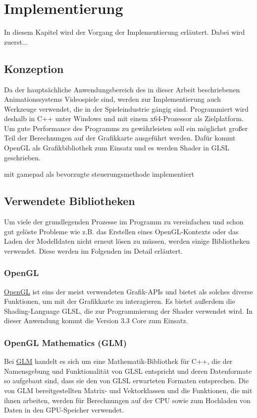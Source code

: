 \chapter{Implementierung}
In diesem Kapitel wird der Vorgang der Implementierung erläutert. Dabei wird zuerst...


\section{Konzeption}
Da der hauptsächliche Anwendungsbereich des in dieser Arbeit beschriebenen Animationssystems Videospiele sind, werden zur Implementierung auch Werkzeuge verwendet, die in der Spieleindustrie gängig sind. Programmiert wird deshalb in C++ unter Windows und mit einem x64-Prozessor als Zielplatform. Um gute Performance des Programms zu gewährleisten soll ein möglichst großer Teil der Berechnungen auf der Grafikkarte ausgeführt werden. Dafür kommt OpenGL als Grafikbibliothek zum Einsatz und es werden Shader in GLSL geschrieben.

mit gamepad als bevorzugte steuerungsmethode implementiert


\section{Verwendete Bibliotheken}
Um viele der grundlegenden Prozesse im Programm zu vereinfachen und schon gut gelöste Probleme wie z.B. das Erstellen eines OpenGL-Kontexts oder das Laden der Modelldaten nicht erneut lösen zu müssen, werden einige Bibliotheken verwendet. Diese werden im Folgenden im Detail erläutert.

\subsection{OpenGL}
\href{https://www.opengl.org/}{OpenGL} ist eins der meist verwendeten Grafik-APIs und bietet als solches diverse Funktionen, um mit der Grafikkarte zu interagieren. Es bietet außerdem die Shading-Language GLSL, die zur Programmierung der Shader verwendet wird. In dieser Anwendung kommt die Version 3.3 Core zum Einsatz.

\subsection{OpenGL Mathematics (GLM)}
Bei \href{https://glm.g-truc.net/0.9.9/index.html}{GLM} handelt es sich um eine Mathematik-Bibliothek für C++, die der Namensgebung und Funktionalität von GLSL entspricht und deren Datenformate so aufgebaut sind, dass sie den von GLSL erwarteten Formaten entsprechen. Die von GLM bereitgestellten Matrix- und Vektorklassen und die Funktionen, die mit ihnen arbeiten, werden für Berechnungen auf der CPU sowie zum Hochladen von Daten in den GPU-Speicher verwendet.

